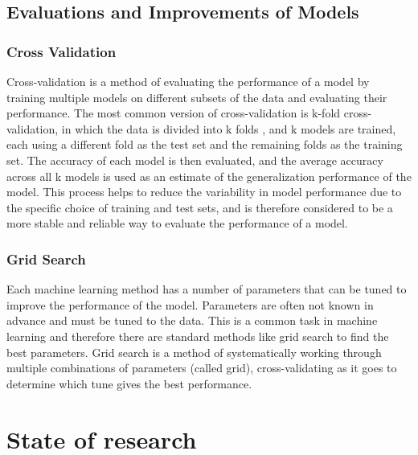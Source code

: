 \subsection{Evaluations and Improvements of Models}

\subsubsection{Cross Validation}
Cross-validation is a method of evaluating the performance of a model by training
multiple models
on different subsets of the data and evaluating their performance. The most common
version of
cross-validation is k-fold cross-validation, in which the data is divided into k folds
, and k
models are trained, each using a different fold as the test set and the remaining folds
as the
training set.
The accuracy of each model is then evaluated, and the average accuracy across all k
models is
used as an estimate of the generalization performance of the model. This process helps
to reduce
the variability in model performance due to the specific choice of training and test
sets, and is
therefore considered to be a more stable and reliable way to evaluate the performance
of a model.
\cite[p. 252-260]{muller_introductionmachinelearning_2016}

\subsubsection{Grid Search}
Each machine learning method has a number of parameters that can be tuned to improve the
performance of the model. Parameters are often not known in advance and must be tuned
to the data.
This is a common task in machine learning and therefore there are standard methods like
grid
search to find the best parameters.
Grid search is a method of systematically working through multiple combinations of
parameters
(called grid), cross-validating as it goes to determine which tune gives the best
performance.
\cite[p. 260-275]{muller_introductionmachinelearning_2016}


\section{State of research}

